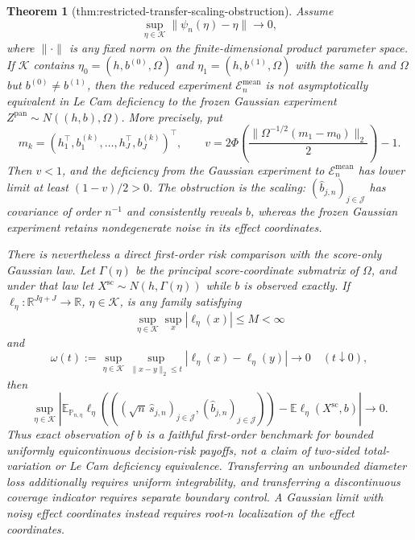 \documentclass{article}
\newtheorem{theorem}{Theorem}
\begin{document}
\begin{theorem}[thm:restricted-transfer-scaling-obstruction]\label{thm:restricted-transfer-scaling-obstruction}
Assume
\[
 \sup_{\eta\in\mathcal K}\lVert\psi_n(\eta)-\eta\rVert\longrightarrow0,
\]
where \(\lVert\cdot\rVert\) is any fixed norm on the finite-dimensional product parameter space.
If \(\mathcal K\) contains \(\eta_0=(h,b^{(0)},\Omega)\) and \(\eta_1=(h,b^{(1)},\Omega)\) with the same \(h\) and \(\Omega\) but \(b^{(0)}\ne b^{(1)}\), then the reduced experiment \(\mathcal E_n^{\mathrm{mean}}\) is not asymptotically equivalent in Le Cam deficiency to the frozen Gaussian experiment \(Z^{\mathrm{pan}}\sim N((h,b),\Omega)\). More precisely, put
\[
 m_k=(h_1^{\top},b^{(k)}_1,\ldots,h_J^{\top},b^{(k)}_J)^{\top},
 \qquad
 v=2\Phi\!\left(\frac{\lVert\Omega^{-1/2}(m_1-m_0)\rVert_2}{2}\right)-1.
\]
Then \(v<1\), and the deficiency from the Gaussian experiment to \(\mathcal E_n^{\mathrm{mean}}\) has lower limit at least \((1-v)/2>0\). The obstruction is the scaling: \((\widehat b_{j,n})_{j\in\mathcal J}\) has covariance of order \(n^{-1}\) and consistently reveals \(b\), whereas the frozen Gaussian experiment retains nondegenerate noise in its effect coordinates.

There is nevertheless a direct first-order risk comparison with the score-only Gaussian law. Let \(\Gamma(\eta)\) be the principal score-coordinate submatrix of \(\Omega\), and under that law let \(X^{\mathrm{sc}}\sim N(h,\Gamma(\eta))\) while \(b\) is observed exactly. If \(\ell_\eta:\mathbb R^{Jq+J}\to\mathbb R\), \(\eta\in\mathcal K\), is any family satisfying
\[
 \sup_{\eta\in\mathcal K}\sup_x|\ell_\eta(x)|\leq M<\infty
\]
and
\[
 \omega(t):=
 \sup_{\eta\in\mathcal K}
 \sup_{\lVert x-y\rVert_2\leq t}
 |\ell_\eta(x)-\ell_\eta(y)|
 \longrightarrow0
 \quad(t\downarrow0),
\]
then
\[
 \sup_{\eta\in\mathcal K}
 \left|
 \mathbb E_{\mathbb P_{n,\eta}}
 \ell_\eta\!\left(((\sqrt n\,\widehat s_{j,n})_{j\in\mathcal J},
                    (\widehat b_{j,n})_{j\in\mathcal J})\right)
 -
 \mathbb E\ell_\eta(X^{\mathrm{sc}},b)
 \right|
 \longrightarrow0.
\]
Thus exact observation of \(b\) is a faithful first-order benchmark for bounded uniformly equicontinuous decision-risk payoffs, not a claim of two-sided total-variation or Le Cam deficiency equivalence. Transferring an unbounded diameter loss additionally requires uniform integrability, and transferring a discontinuous coverage indicator requires separate boundary control. A Gaussian limit with noisy effect coordinates instead requires root-\(n\) localization of the effect coordinates.
\end{theorem}
\end{document}
